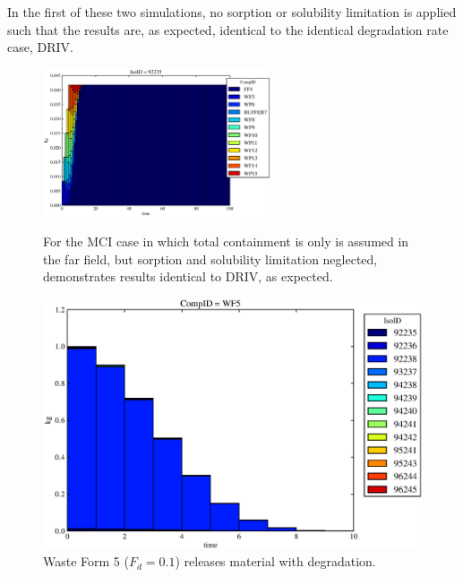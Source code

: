 

In the first of these two simulations, no sorption or solubility limitation is 
applied such that the results are, as expected, identical to the identical 
degradation rate case, DRIV.

\begin{figure}[ht]
\centering
\includegraphics[width=0.6\textwidth]{./chapters/demonstration/base/mcI.eps}
\caption[$^{235}U$ residence. Mixed Cell Without Sorption or Solubility Limitation.]{
For the MCI case in which total containment is only is assumed in the far field, 
but sorption and solubility limitation neglected, demonstrates results identical to 
DRIV, as expected.}
\label{fig:mcI}
\begin{minipage}[b]{0.45\linewidth}

  \includegraphics[width=\textwidth]{./chapters/demonstration/base/mcI1.eps}
  \caption[Case MCI Waste Form Contaminants.]{
    Waste Form 5 ($F_d = 0.1$) releases material with degradation. 
    }
  \label{fig:mcIwf5}
  

\end{minipage}
\end{figure}
